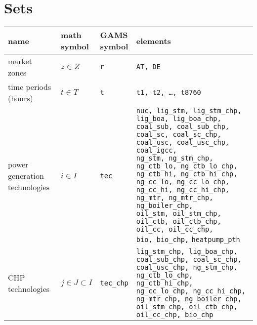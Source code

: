 \documentclass[11pt,a4paper]{article}
\begin{document}
\section{Sets} \label{sets}
\begin{tabular}{l l l l}
\textbf{name} & \makecell[l]{\textbf{math} \\ \textbf{symbol}} & \makecell[l]{\textbf{GAMS} \\\textbf{symbol}} & \textbf{elements} \\
\hline \hline
market zones & $z \in Z$ & \texttt{r} & \texttt{AT, DE} \\ \hline

\makecell[l]{time periods \\(hours)} & $t \in T$ & \texttt{t} & \texttt{t1, t2, \ldots, t8760} \\ \hline

\makecell[l]{power \\generation \\technologies} & $i \in I$ & \texttt{tec} & 

\makecell[l]{ \texttt{nuc, lig\_stm, lig\_stm\_chp,}\\
	\texttt{lig\_boa, lig\_boa\_chp,} \\
	\texttt{coal\_sub, coal\_sub\_chp,} \\
	\texttt{coal\_sc, coal\_sc\_chp,}\\
	\texttt{coal\_usc, coal\_usc\_chp,} \\
	\texttt{coal\_igcc,}\\
	\texttt{ng\_stm, ng\_stm\_chp,} \\
	\texttt{ng\_ctb\_lo, ng\_ctb\_lo\_chp,}\\ 
	\texttt{ng\_ctb\_hi, ng\_ctb\_hi\_chp,}\\
	\texttt{ng\_cc\_lo, ng\_cc\_lo\_chp,}\\
	\texttt{ng\_cc\_hi, ng\_cc\_hi\_chp,}\\
	\texttt{ng\_mtr, ng\_mtr\_chp,} \\
	\texttt{ng\_boiler\_chp,} \\
	\texttt{oil\_stm, oil\_stm\_chp,} \\ 
	\texttt{oil\_ctb, oil\_ctb\_chp,} \\
	\texttt{oil\_cc, oil\_cc\_chp,} \\
	\texttt{bio, bio\_chp,}
	\texttt{heatpump\_pth} 
} \\ \hline

\makecell[l]{CHP \\technologies} & $j \in J \subset I$ & \texttt{tec\_chp} & \makecell[l]{
	\texttt{lig\_stm\_chp, lig\_boa\_chp,}\\
	\texttt{coal\_sub\_chp, coal\_sc\_chp,}\\
	\texttt{coal\_usc\_chp, ng\_stm\_chp,}\\ 
	\texttt{ng\_ctb\_lo\_chp, ng\_ctb\_hi\_chp,}\\
	\texttt{ng\_cc\_lo\_chp, ng\_cc\_hi\_chp,}\\
	\texttt{ng\_mtr\_chp, ng\_boiler\_chp,}\\
	\texttt{oil\_stm\_chp, oil\_ctb\_chp,} \\ 
	\texttt{oil\_cc\_chp, bio\_chp} } \\ \hline


\end{tabular}
\end{document}
